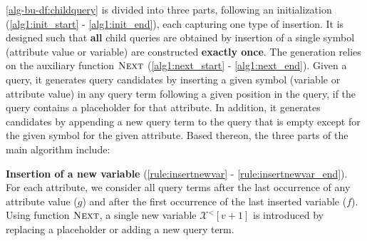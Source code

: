 \autoref{alg-bu-df:childquery} is divided into three parts, following an
initialization (\autoref{alg1:init_start} - \ref{alg1:init_end}),
each capturing one type of insertion. It is designed such that \textbf{all}
child queries are obtained by
insertion
of a single symbol (attribute value or variable) are constructed
\textbf{exactly once}. The generation relies on the auxiliary function
$\textsc{Next}$
(\autoref{alg1:next_start} - \ref{alg1:next_end}). Given a query, it
generates query candidates by inserting a given symbol (variable or attribute value) in
any query term following a given position in the query, if the query
contains a placeholder for that attribute. In addition, it
generates candidates by appending a new query term to the query that
is empty except for the given symbol for the given attribute. Based thereon,
the three parts of the main algorithm include:

\textbf{Insertion of a new variable} (\autoref{rule:insertnewvar} -
\ref{rule:insertnewvar_end}). For each attribute, we consider all query
terms after the last occurrence of any attribute value ($g$) and after the first
occurrence of the last inserted variable ($f$). Using function
$\textsc{Next}$, a single new variable $\mathcal{X}^<[v+1]$ is introduced
by replacing a placeholder or adding a new query term.

